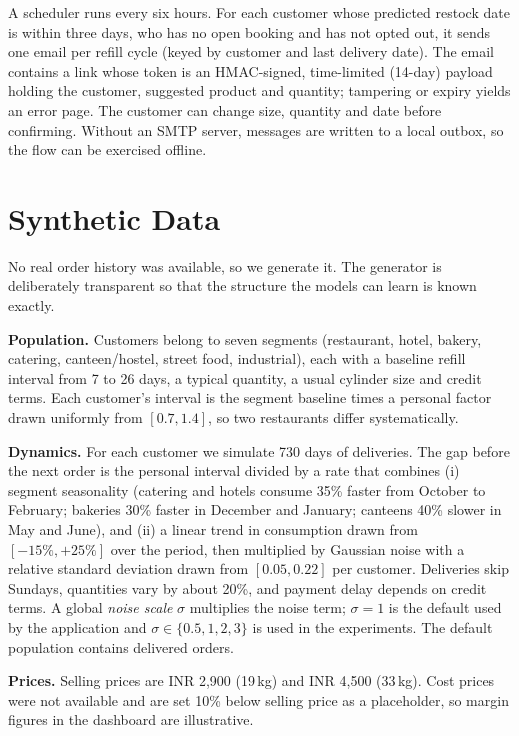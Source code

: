 \documentclass[conference]{IEEEtran}
\begin{document}
A scheduler runs every six hours. For each customer whose predicted restock date is within three days, who has no open booking and has not opted out, it sends one email per refill cycle (keyed by customer and last delivery date). The email contains a link whose token is an HMAC-signed, time-limited (14-day) payload holding the customer, suggested product and quantity; tampering or expiry yields an error page. The customer can change size, quantity and date before confirming. Without an SMTP server, messages are written to a local outbox, so the flow can be exercised offline.

\section{Synthetic Data}\label{sec:data}
No real order history was available, so we generate it. The generator is deliberately transparent so that the structure the models can learn is known exactly.

\textbf{Population.} Customers belong to seven segments (restaurant, hotel, bakery, catering, canteen/hostel, street food, industrial), each with a baseline refill interval from 7 to 26 days, a typical quantity, a usual cylinder size and credit terms. Each customer's interval is the segment baseline times a personal factor drawn uniformly from $[0.7, 1.4]$, so two restaurants differ systematically.

\textbf{Dynamics.} For each customer we simulate 730 days of deliveries. The gap before the next order is the personal interval divided by a rate that combines (i) segment seasonality (catering and hotels consume 35\% faster from October to February; bakeries 30\% faster in December and January; canteens 40\% slower in May and June), and (ii) a linear trend in consumption drawn from $[-15\%, +25\%]$ over the period, then multiplied by Gaussian noise with a relative standard deviation drawn from $[0.05, 0.22]$ per customer. Deliveries skip Sundays, quantities vary by about 20\%, and payment delay depends on credit terms. A global \emph{noise scale} $\sigma$ multiplies the noise term; $\sigma{=}1$ is the default used by the application and $\sigma\in\{0.5,1,2,3\}$ is used in the experiments. The default population contains \NOrders{} delivered orders.

\textbf{Prices.} Selling prices are INR 2{,}900 (19\,kg) and INR 4{,}500 (33\,kg). Cost prices were not available and are set 10\% below selling price as a placeholder, so margin figures in the dashboard are illustrative.
\end{document}
